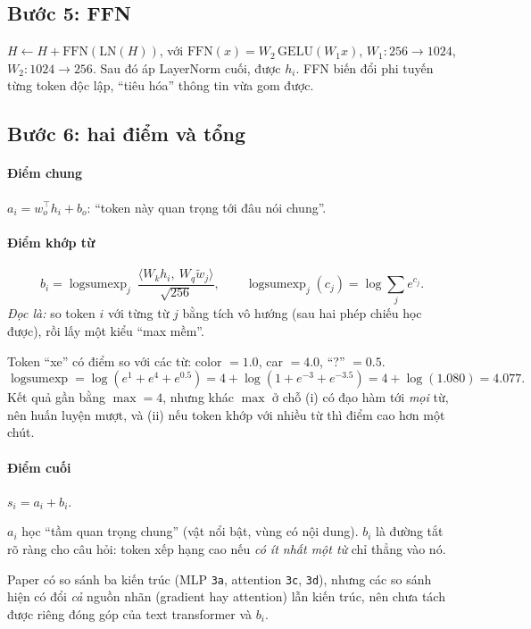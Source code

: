 \documentclass[11pt,a4paper]{article}
\newcommand{\lse}{\operatorname{logsumexp}}
\begin{document}
\subsection{Bước 5: FFN}
$H\leftarrow H+\mathrm{FFN}(\mathrm{LN}(H))$, với $\mathrm{FFN}(x)=W_2\,\mathrm{GELU}(W_1x)$, $W_1:256\to1024$, $W_2:1024\to256$. Sau đó áp LayerNorm cuối, được $h_i$. FFN biến đổi phi tuyến từng token độc lập, ``tiêu hóa'' thông tin vừa gom được.

\subsection{Bước 6: hai điểm và tổng}
\paragraph{Điểm chung} $a_i=w_o^\top h_i+b_o$: ``token này quan trọng tới đâu nói chung''.

\paragraph{Điểm khớp từ}
\begin{equation}
b_i=\lse_{j}\ \frac{\langle W_k h_i,\ W_q\tilde w_j\rangle}{\sqrt{256}},\qquad \lse_j(c_j)=\log\sum_j e^{c_j}.
\end{equation}
\emph{Đọc là:} so token $i$ với từng từ $j$ bằng tích vô hướng (sau hai phép chiếu học được), rồi lấy một kiểu ``max mềm''.

\begin{vidu}
Token ``xe'' có điểm so với các từ: color $=1.0$, car $=4.0$, ``?'' $=0.5$.
\[
\lse=\log(e^{1}+e^{4}+e^{0.5})=4+\log(1+e^{-3}+e^{-3.5})=4+\log(1.080)=4.077.
\]
Kết quả gần bằng $\max=4$, nhưng khác $\max$ ở chỗ (i) có đạo hàm tới \emph{mọi} từ, nên huấn luyện mượt, và (ii) nếu token khớp với nhiều từ thì điểm cao hơn một chút.
\end{vidu}

\paragraph{Điểm cuối} $s_i=a_i+b_i$.

\begin{visao}
$a_i$ học ``tầm quan trọng chung'' (vật nổi bật, vùng có nội dung). $b_i$ là đường tắt rõ ràng cho câu hỏi: token xếp hạng cao nếu \emph{có ít nhất một từ} chỉ thẳng vào nó.
\end{visao}

\begin{luuy}
Paper có so sánh ba kiến trúc (MLP \texttt{3a}, attention \texttt{3c}, \texttt{3d}), nhưng các so sánh hiện có đổi \emph{cả} nguồn nhãn (gradient hay attention) lẫn kiến trúc, nên chưa tách được riêng đóng góp của text transformer và $b_i$.
\end{luuy}
\end{document}
